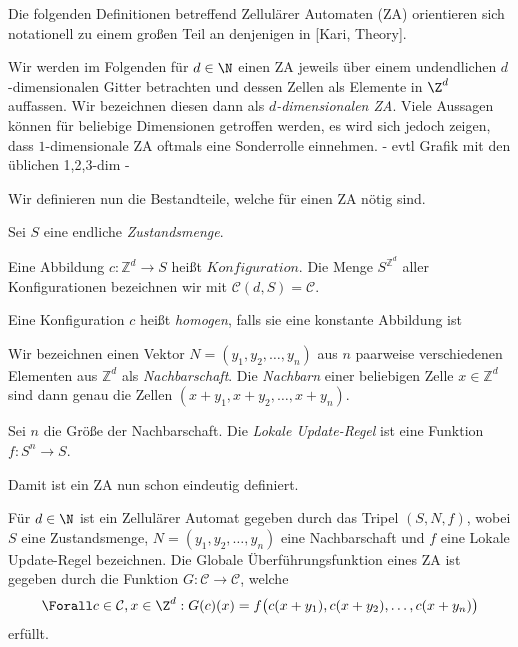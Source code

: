 Die folgenden Definitionen betreffend Zellulärer Automaten (ZA) orientieren sich notationell zu einem großen Teil an denjenigen in [Kari, Theory].

Wir werden im Folgenden für $d \in \N$ einen ZA jeweils über einem undendlichen $d$-dimensionalen Gitter betrachten und dessen Zellen als Elemente in $\Z^d$ auffassen. Wir bezeichnen diesen dann als \textit{$d$-dimensionalen ZA}. Viele Aussagen können für beliebige Dimensionen getroffen werden, es wird sich jedoch zeigen, dass $1$-dimensionale ZA oftmals eine Sonderrolle einnehmen.
- evtl Grafik mit den üblichen 1,2,3-dim -

Wir definieren nun die Bestandteile, welche für einen ZA nötig sind.

\begin{definition}
  Sei $S$ eine endliche \textit{Zustandsmenge}.

  Eine Abbildung $c: \mathbb{Z}^d \to S$  heißt $Konfiguration$. Die Menge $S^{\mathbb{Z}^d}$ aller Konfigurationen bezeichnen wir mit $\mathcal{C}(d, S) = \mathcal{C}$.

  Eine Konfiguration $c$ heißt \textit{homogen}, falls sie eine konstante Abbildung ist

  Wir bezeichnen einen Vektor $N = (y_1, y_2, \dots, y_n)$ aus $n$ paarweise verschiedenen Elementen aus $\mathbb{Z}^d$ als \textit{Nachbarschaft}. Die \textit{Nachbarn} einer beliebigen Zelle $x \in \mathbb{Z}^d$ sind dann genau die Zellen $(x + y_1, x + y_2, \dots, x + y_n)$.

  Sei $n$ die Größe der Nachbarschaft. Die \textit{Lokale Update-Regel} ist eine Funktion $f: S^n \to S$.
\end{definition}

Damit ist ein ZA nun schon eindeutig definiert.

\begin{definition}
  Für $d \in \N$ ist ein Zellulärer Automat gegeben durch das Tripel $(S, N, f)$, wobei $S$ eine Zustandsmenge, $N = (y_1, y_2, \dots, y_n)$ eine Nachbarschaft und $f$ eine Lokale Update-Regel bezeichnen.
  Die Globale Überführungsfunktion eines ZA ist gegeben durch die Funktion $G: \mathcal{C} \to \mathcal{C}$, welche
  \begin{align*}
    \Forall c \in \mathcal{C}, x \in \Z^d: G(c)(x) = f \big(c(x+y_1), c(x+y_2), \dots, c(x+y_n)\big)
  \end{align*}
  erfüllt.
\end{definition}

